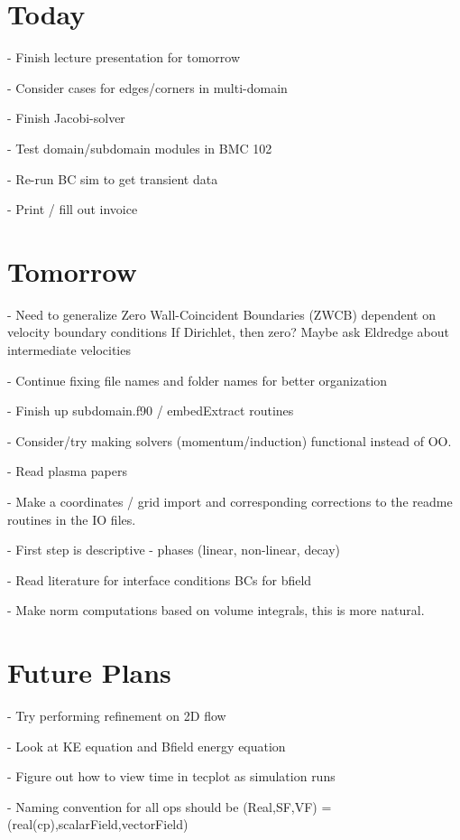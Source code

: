 \documentclass[11pt]{article}
\begin{document}
\section{Today}

- Finish lecture presentation for tomorrow

- Consider cases for edges/corners in multi-domain

- Finish Jacobi-solver

- Test domain/subdomain modules in BMC 102

- Re-run BC sim to get transient data

- Print / fill out invoice

\section{Tomorrow}


- Need to generalize Zero Wall-Coincident Boundaries (ZWCB) dependent on velocity boundary conditions
	If Dirichlet, then zero?
	Maybe ask Eldredge about intermediate velocities

- Continue fixing file names and folder names for better organization

- Finish up subdomain.f90 / embedExtract routines

- Consider/try making solvers (momentum/induction) functional instead of OO.

- Read plasma papers

- Make a coordinates / grid import and corresponding corrections to the readme routines in the IO files.

- First step is descriptive - phases (linear, non-linear, decay)

- Read literature for interface conditions BCs for bfield

- Make norm computations based on volume integrals, this is more natural.

\section{Future Plans}

- Try performing refinement on 2D flow

- Look at KE equation and Bfield energy equation

- Figure out how to view time in tecplot as simulation runs

- Naming convention for all ops should be (Real,SF,VF) = (real(cp),scalarField,vectorField)
\end{document}
